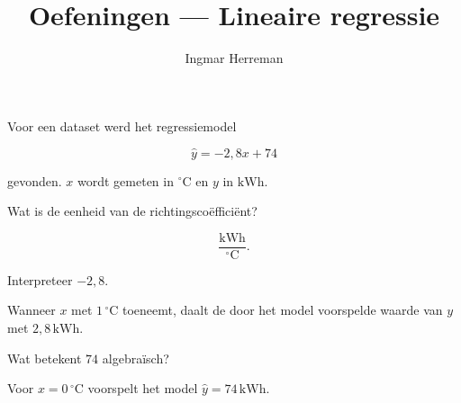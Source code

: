 \documentclass{ximera}
\title{Oefeningen --- Lineaire regressie}
\author{Ingmar Herreman}
\begin{document}




















\maketitle




\begin{oefening}{\oefB \ESS}

Voor een dataset werd het regressiemodel

\[
\hat y=-2{,}8x+74
\]

gevonden. $x$ wordt gemeten in ${}^{\circ}\mathrm C$ en $y$ in
$\mathrm{kWh}$.

\begin{question}
Wat is de eenheid van de richtingscoëfficiënt?

\begin{oplossing}
\[
\frac{\mathrm{kWh}}{{}^{\circ}\mathrm C}.
\]
\end{oplossing}
\end{question}

\begin{question}
Interpreteer $-2{,}8$.

\begin{oplossing}
Wanneer $x$ met $1\,{}^{\circ}\mathrm C$ toeneemt, daalt de door het
model voorspelde waarde van $y$ met $2{,}8\,\mathrm{kWh}$.
\end{oplossing}
\end{question}

\begin{question}
Wat betekent $74$ algebraïsch?

\begin{oplossing}
Voor $x=0\,{}^{\circ}\mathrm C$ voorspelt het model
$\hat y=74\,\mathrm{kWh}$.
\end{oplossing}
\end{question}
\end{oefening}
\end{document}
